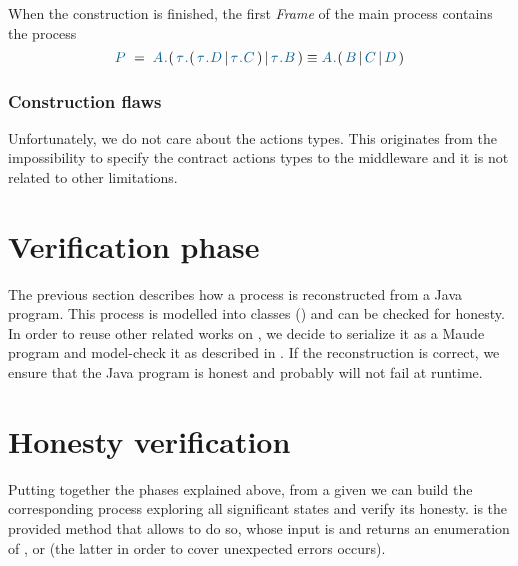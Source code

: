 When the construction is finished, the first \textit{\coco{}Frame} of the main process contains the \coco process
\[
		\procP \; = \; \procFmt{A} \cocoSeq (\,\tau \cocoSeq (\,\tau \cocoSeq \procFmt{D}  \,|\, \tau \cocoSeq \procFmt{C}\,) \,| \,\tau \cocoSeq \procFmt{B}\,) \equiv \procFmt{A} \cocoSeq (\, \procFmt{B} \,|\, \procFmt{C}\, | \,\procFmt{D}\,)
\]

\subsubsection{Construction flaws}
Unfortunately, we do not care about the actions types. This originates from the impossibility to specify the contract actions types to the middleware and it is not related to other limitations.

\section{Verification phase}\label{sec:verification-phase}
The previous section describes how a \coco process is reconstructed from a Java program. This process is modelled into classes () and can be checked for honesty. In order to reuse other related works on \coco, we decide to serialize it as a Maude program and model-check it as described in . If the reconstruction is correct, we ensure that the Java program is honest and probably will not fail at runtime.

\section{Honesty verification}
Putting together the phases explained above, from a given  we can build the corresponding \coco process exploring all significant states and verify its honesty.  is the provided method that allows to do so, whose input is  and returns an enumeration of ,  or  (the latter in order to cover unexpected errors occurs).
